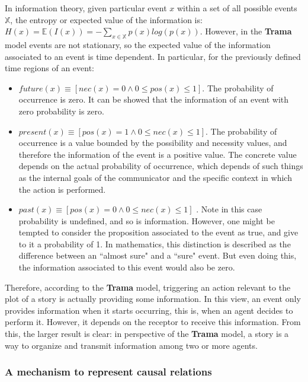 \documentclass[
		twoside,openright,titlepage,numbers=noenddot,manychapters,
		headinclude,%
                footinclude=false,cleardoublepage=empty,
                BCOR=5mm,
		fontsize=11pt, %
                 enabledeprecatedfontcommands]{scrreprt}
\begin{document}
In information theory, given particular event $x$ within a set of all possible events $\mathbb{X}$, the entropy or expected value of the information is: $H(x)= \mathbb{E}(I(x))= - \sum_{x \in \mathbb{X}} p(x) log(p(x))$. However, in the \textbf{Trama} model events are not stationary, so the expected value of the information associated to an event is time dependent. In particular, for the previously defined time regions of an event:


\begin{itemize}
\item $future(x) \equiv [nec(x)=0 \wedge 0 \leq pos(x) \leq 1 ]$. The probability of occurrence is zero. It can be showed that the information of an event with zero probability is zero.
\item $present(x) \equiv [pos(x)=1 \wedge 0 \leq nec(x) \leq 1 ]$. The probability of occurrence is a value bounded by the possibility and necessity values, and therefore the information of the event is a positive value. The concrete value depends on the actual probability of occurrence, which depends of such things as the internal goals of the communicator and the specific context in which the action is performed.
\item $past(x) \equiv [pos(x)=0 \wedge  0 \leq nec(x) \leq 1]$ . Note in this case probability is undefined, and so is information. However, one might be tempted to consider the proposition associated to the event as true, and give to it a probability of 1. In mathematics, this distinction is described as the difference between an ``almost sure" and a ``sure" event. But even doing this, the information associated to this event would also be zero.
\end{itemize}

Therefore, according to the \textbf{Trama} model, triggering  an action relevant to the plot of a story is actually providing some information. In this view, an event only provides information when it starts occurring, this is,  when an agent decides to perform it. However, it depends on the receptor to receive this information. From this, the larger result is clear: in perspective of the \textbf{Trama} model, a story is a way to organize and transmit information among two or more agents.




\subsubsection{A mechanism to represent causal relations}
\end{document}
